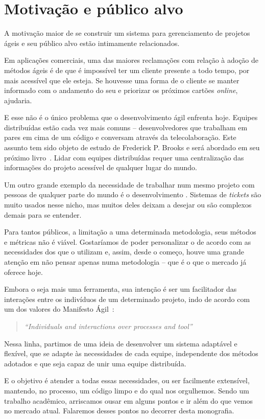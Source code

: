\section{Motivação e público alvo}

A motivação maior de se construir um sistema para gerenciamento de projetos ágeis e seu público alvo estão intimamente relacionados. 

Em aplicações comerciais, uma das maiores reclamações com relação à adoção de métodos ágeis é de que é impossível ter um cliente presente a todo tempo, por mais acessível que ele esteja. Se houvesse uma forma de o cliente se manter informado com o andamento do seu \software{} e priorizar os próximos cartões \textit{online}, ajudaria.

E esse não é o único problema que o desenvolvimento ágil enfrenta hoje. Equipes distribuídas estão cada vez mais comuns -- desenvolvedores que trabalham em pares em cima de um código e conversam através da telecolaboração. Este assunto tem sido objeto de estudo de Frederick P. Brooks e será abordado em seu próximo livro~\cite{brooks}. Lidar com equipes distribuídas requer uma centralização das informações do projeto acessível de qualquer lugar do mundo.

Um outro grande exemplo da necessidade de trabalhar num mesmo projeto com pessoas de qualquer parte do mundo é o desenvolvimento \opensource{}. Sistemas de \textit{tickets} são muito usados nesse nicho, mas muitos deles deixam a desejar ou são complexos demais para se entender.

Para tantos públicos, a limitação a uma determinada metodologia, seus métodos e métricas não é viável. Gostaríamos de poder personalizar o \calopsita{} de acordo com as necessidades dos que o utilizam e, assim, desde o começo, houve uma grande atenção em não pensar apenas numa metodologia -- que é o que o mercado já oferece hoje.

Embora o \calopsita{} seja mais uma ferramenta, sua intenção é ser um facilitador das interações entre os indivíduos de um determinado projeto, indo de acordo com um dos valores do Manifesto Ágil~\cite{manifesto}:

\begin{quote}
\textit{``Individuals and interactions over processes and tool''}
\end{quote}

Nessa linha, partimos de uma ideia de desenvolver um sistema adaptável e flexível, que se adapte às necessidades de cada equipe, independente dos métodos adotados e que seja capaz de unir uma equipe distribuída.

E o objetivo é atender a todas essas necessidades, ou ser facilmente extensível, mantendo, no processo, um código limpo e do qual nos orgulhemos. Sendo um trabalho acadêmico, arriscamos ousar em alguns pontos e ir além do que vemos no mercado atual. Falaremos desses pontos no decorrer desta monografia.
